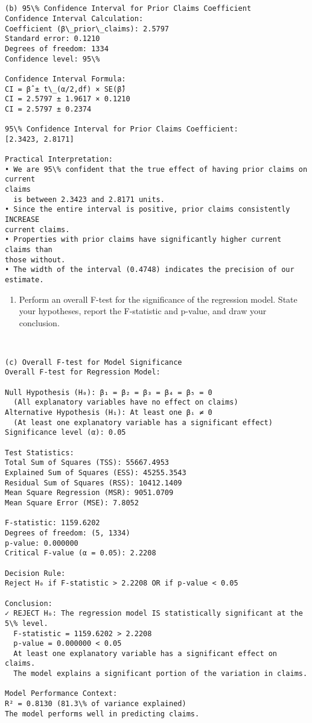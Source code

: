 \documentclass[8pt, twocolumn]{extarticle}
\providecommand{\tightlist}{%
      \setlength{\itemsep}{0pt}\setlength{\parskip}{0pt}}
\begin{document}
    \begin{Verbatim}[commandchars=\\\{\}]


(b) 95\% Confidence Interval for Prior Claims Coefficient
Confidence Interval Calculation:
Coefficient (β\_prior\_claims): 2.5797
Standard error: 0.1210
Degrees of freedom: 1334
Confidence level: 95\%

Confidence Interval Formula:
CI = β̂ ± t\_(α/2,df) × SE(β̂)
CI = 2.5797 ± 1.9617 × 0.1210
CI = 2.5797 ± 0.2374

95\% Confidence Interval for Prior Claims Coefficient:
[2.3423, 2.8171]

Practical Interpretation:
• We are 95\% confident that the true effect of having prior claims on current
claims
  is between 2.3423 and 2.8171 units.
• Since the entire interval is positive, prior claims consistently INCREASE
current claims.
• Properties with prior claims have significantly higher current claims than
those without.
• The width of the interval (0.4748) indicates the precision of our estimate.
    \end{Verbatim}

    \begin{enumerate}
\def\labelenumi{(\alph{enumi})}
\setcounter{enumi}{2}
\tightlist
\item
  Perform an overall F-test for the significance of the regression
  model. State your hypotheses, report the F-statistic and p-value, and
  draw your conclusion.
\end{enumerate}

    \begin{Verbatim}[commandchars=\\\{\}]


(c) Overall F-test for Model Significance
Overall F-test for Regression Model:

Null Hypothesis (H₀): β₁ = β₂ = β₃ = β₄ = β₅ = 0
  (All explanatory variables have no effect on claims)
Alternative Hypothesis (H₁): At least one βᵢ ≠ 0
  (At least one explanatory variable has a significant effect)
Significance level (α): 0.05

Test Statistics:
Total Sum of Squares (TSS): 55667.4953
Explained Sum of Squares (ESS): 45255.3543
Residual Sum of Squares (RSS): 10412.1409
Mean Square Regression (MSR): 9051.0709
Mean Square Error (MSE): 7.8052

F-statistic: 1159.6202
Degrees of freedom: (5, 1334)
p-value: 0.000000
Critical F-value (α = 0.05): 2.2208

Decision Rule:
Reject H₀ if F-statistic > 2.2208 OR if p-value < 0.05

Conclusion:
✓ REJECT H₀: The regression model IS statistically significant at the 5\% level.
  F-statistic = 1159.6202 > 2.2208
  p-value = 0.000000 < 0.05
  At least one explanatory variable has a significant effect on claims.
  The model explains a significant portion of the variation in claims.

Model Performance Context:
R² = 0.8130 (81.3\% of variance explained)
The model performs well in predicting claims.
    \end{Verbatim}
\end{document}
